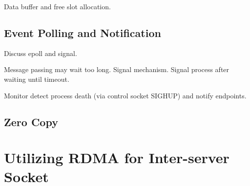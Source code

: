 Data buffer and free slot allocation.

\subsection{Event Polling and Notification}

Discuss epoll and signal.

Message passing may wait too long.
Signal mechanism. Signal process after waiting until timeout.

Monitor detect process death (via control socket SIGHUP) and notify endpoints.


\subsection{Zero Copy}



\section{Utilizing RDMA for Inter-server Socket}
\label{sec:rdma}

